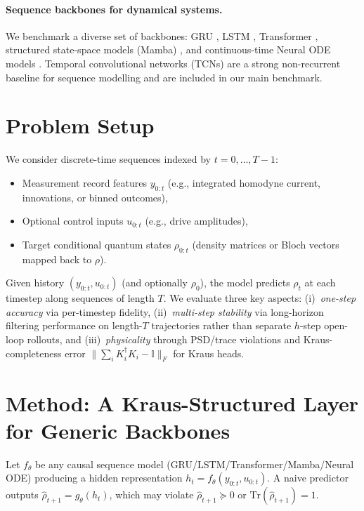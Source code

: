 \documentclass{article} %
\providecommand{\Tr}{\mathrm{Tr}}
\providecommand{\rh}{\rho}
\begin{document}
\paragraph{Sequence backbones for dynamical systems.}
We benchmark a diverse set of backbones:
GRU \citep{cho2014gru}, LSTM \citep{hochreiter1997lstm}, Transformer \citep{vaswani2017attention}, structured state-space models (Mamba) \citep{gu2024mamba}, and continuous-time Neural ODE models \citep{chen2018neuralode}.
Temporal convolutional networks (TCNs) are a strong non-recurrent baseline for sequence modelling \citep{bai2018tcn} and are included in our main benchmark.
\section{Problem Setup}
We consider discrete-time sequences indexed by $t=0,\dots,T-1$:
\begin{itemize}
  \item Measurement record features $y_{0:t}$ (e.g., integrated homodyne current, innovations, or binned outcomes),
  \item Optional control inputs $u_{0:t}$ (e.g., drive amplitudes),
  \item Target conditional quantum states $\rh_{0:t}$ (density matrices or Bloch vectors mapped back to $\rh$).
\end{itemize}
Given history $(y_{0:t}, u_{0:t})$ (and optionally $\rho_0$), the model predicts $\rho_t$ at each timestep along sequences of length $T$. We evaluate three key aspects: (i)~\emph{one-step accuracy} via per-timestep fidelity, (ii)~\emph{multi-step stability} via long-horizon filtering performance on length-$T$ trajectories rather than separate $h$-step open-loop rollouts, and (iii)~\emph{physicality} through PSD/trace violations and Kraus-completeness error $\|\sum_i K_i^\dagger K_i - \mathbb{I}\|_F$ for Kraus heads.

\section{Method: A Kraus-Structured Layer for Generic Backbones}
Let $f_\theta$ be any causal sequence model (GRU/LSTM/Transformer/Mamba/Neural ODE) producing a hidden representation $h_t=f_\theta(y_{0:t},u_{0:t})$.
A naive predictor outputs $\widehat{\rh}_{t+1}=g_\theta(h_t)$, which may violate $\widehat{\rh}_{t+1}\succeq 0$ or $\Tr(\widehat{\rh}_{t+1})=1$.
\end{document}
